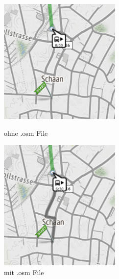 \begin{figure}[htb]
	\centering
	\begin{minipage}{0.45\linewidth}
		\centering
		\includegraphics[width=6cm]{img/ohneosmfile.png}
		\caption{ohne .osm File}
		\label{fig:ohneosmfile}
	\end{minipage}
	\begin{minipage}{0.45\linewidth}
		\centering
		\includegraphics[width=6cm]{img/mitosmfile.png}
		\caption{mit .osm File}
		\label{fig:mitosmfile}
	\end{minipage}
\end{figure}





